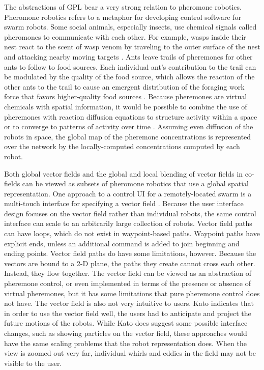 \documentclass[]{article}
\begin{document}
The abstractions of GPL bear a very strong relation to pheromone robotics. 
Pheromone robotics refers to a metaphor for developing control software for swarm robots. 
Some social animals, especially insects, use chemical signals called pheromones to communicate with each other. 
For example, wasps inside their nest react to the scent of wasp venom by traveling to the outer surface of the nest and attacking nearby moving targets  \cite{jeanne1981alarm}.
Ants leave trails of pheremones for other ants to follow to food sources. 
Each individual ant's contribution to the trail can be modulated by the quality of the food source, which allows the reaction of the other ants to the trail to cause an emergent distribution of the foraging work force that favors higher-quality food sources \cite{sumpter2003nonlinearity}.
Because pheremones are virtual chemicals with spatial information, it would be possible to combine the use of pheremones with reaction diffusion equations to structure activity within a space or to converge to patterns of activity over time  \cite{turing1952chemical}. 
Assuming even diffusion of the robots in space, the global map of the pheremone concentrations is represented over the network by the locally-computed concentrations computed by each robot.

Both global vector fields and the global and local blending of vector fields in co-fields can be viewed as subsets of pheromone robotics that use a global spatial representation. 
One approach to a control UI for a remotely-located swarm is a multi-touch interface for specifying a vector field \cite{Kato:2009:MIC:1520340.1520500}.
Because the user interface design focuses on the vector field rather than individual robots, the same control interface can scale to an arbitrarily large collection of robots. 
Vector field paths can have loops, which do not exist in waypoint-based paths. 
Waypoint paths have explicit ends, unless an additional command is added to join beginning and ending points. 
Vector field paths do have some limitations, however. 
Because the vectors are bound to a 2-D plane, the paths they create cannot cross each other. 
Instead, they flow together. 
The vector field can be viewed as an abstraction of pheremone control, or even implemented in terms of the presence or absence of virtual pheremones, but it has some limitations that pure pheremone control does not have.
The vector field is also not very intuitive to users. 
Kato indicates that in order to use the vector field well, the users had to anticipate and project the future motions of the robots. 
While Kato does suggest some possible interface changes, such as showing particles on the vector field, these approaches would have the same scaling problems that the robot representation does. 
When the view is zoomed out very far, individual whirls and eddies in the field may not be visible to the user. 
\end{document}
